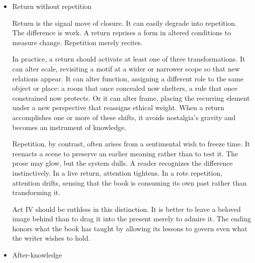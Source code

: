 \documentclass[11pt]{article}
\begin{document}
\begin{itemize}
Openness carries responsibilities. First, it must be earned. A text that withholds resolution because it failed to build the conditions for resolution is not open; it is unfinished. Second, it must be proportionate. If every thread is left fluttering, the effect is not generosity but abdication. The ending should identify which patterns have reached a temporary equilibrium and which remain under investigation. Third, it should distribute continuation. The story that began with a single “I” can end by indicating the other centers that now share the field: the people, places, rituals, and tools that will go on acting.

There is also an ethics of not foreclosing futures that do not belong to the narrator. A memoir that involves other lives does not get to decide their trajectories in its last paragraph. Openness here is a discipline of restraint: the refusal to convert another person into narrative material when the story’s argument no longer requires it. The final gesture should leave space where other subjectivities can breathe without the book’s supervision.
\item Return without repetition
\label{sec:org0ca0be6}

Return is the signal move of closure. It can easily degrade into repetition. The difference is work. A return reprises a form in altered conditions to measure change. Repetition merely recites.

In practice, a return should activate at least one of three transformations. It can alter scale, revisiting a motif at a wider or narrower scope so that new relations appear. It can alter function, assigning a different role to the same object or place: a room that once concealed now shelters, a rule that once constrained now protects. Or it can alter frame, placing the recurring element under a new perspective that reassigns ethical weight. When a return accomplishes one or more of these shifts, it avoids nostalgia’s gravity and becomes an instrument of knowledge.

Repetition, by contrast, often arises from a sentimental wish to freeze time. It reenacts a scene to preserve an earlier meaning rather than to test it. The prose may glow, but the system dulls. A reader recognizes the difference instinctively. In a live return, attention tightens. In a rote repetition, attention drifts, sensing that the book is consuming its own past rather than transforming it.

Act IV should be ruthless in this distinction. It is better to leave a beloved image behind than to drag it into the present merely to admire it. The ending honors what the book has taught by allowing its lessons to govern even what the writer wishes to hold.
\item After-knowledge
\label{sec:org7643917}


\end{itemize}
\end{document}
